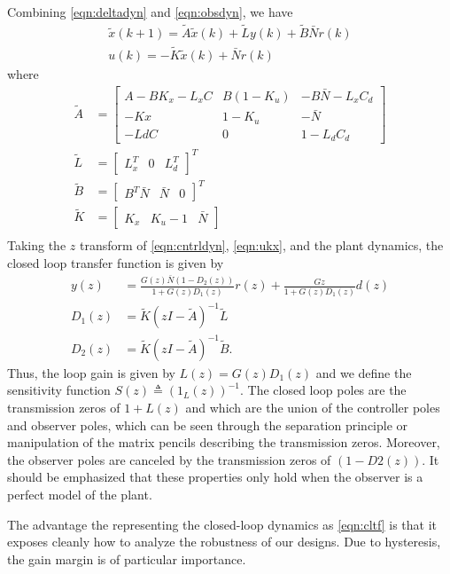 \documentclass[journal,twocolumn,twoside]{IEEEtran}
\newcommand{\x}{\ensuremath{x }\xspace}
\begin{document}
Combining \eqref{eqn:deltadyn} and \eqref{eqn:obsdyn}, we have
\begin{align}
\tilde{\x}(k+1) = \tilde{A}\tilde{\x}(k) + \tilde{L}y(k) + \tilde{B}\bar{N}r(k)\label{eqn:cntrldyn}\\
u(k) = -\tilde{K}\tilde{\x}(k) + \bar{N} r(k) \label{eqn:ukx}
\end{align}
where
\begin{align}
  \tilde{A} &= \begin{bmatrix}
    A-BK_x-L_xC & B(1-K_u) & -B\bar{N} - L_xC_d\\
    -Kx        & 1-K_u    & -\bar{N} \\
    -LdC      & 0        & 1-L_dC_d
  \end{bmatrix}\\
  \tilde{L} &= \begin{bmatrix} L_x^T & 0 & L_d^T  \end{bmatrix}^T\\
  \tilde{B} &= \begin{bmatrix} B^T\bar{N} & \bar{N} &0\end{bmatrix}^T\\
  \tilde{K} &= \begin{bmatrix}K_x & K_u-1 & \bar{N}\end{bmatrix} \nonumber\\
\end{align}
Taking the $z$ transform of \eqref{eqn:cntrldyn}, \eqref{eqn:ukx}, and the plant dynamics, the closed loop transfer function is given by
\begin{align}
  y(z) &= \frac{G(z)\bar{N}(1-D_2(z))}{1 + G(z)D_1(z)} r(z) + \frac{G{z}}{1 + G(z)D_1(z)}d(z)\label{eqn:cltf}\\
  D_1(z) &= \tilde{K}(zI -\tilde{A})^{-1}\tilde{L}\\
  D_2(z) &= \tilde{K}(zI -\tilde{A})^{-1}\tilde{B}.
\end{align}
Thus, the loop gain is given by $L(z) = G(z)D_1(z)$ and we define the sensitivity function $S(z)\triangleq (1_L(z))^{-1}$. The closed loop poles are the transmission zeros of $1+L(z)$ and which are the union of the controller poles and observer poles, which can be seen through the separation principle or manipulation of the matrix pencils describing the transmission zeros. Moreover, the observer poles are canceled by the transmission zeros of $(1-D2(z))$. It should be emphasized that these properties only hold when the observer is a perfect model of the plant.

The advantage the representing the closed-loop dynamics as \eqref{eqn:cltf} is that it exposes cleanly how to analyze the robustness of our designs. Due to hysteresis, the gain margin is of particular importance. 
\end{document}
